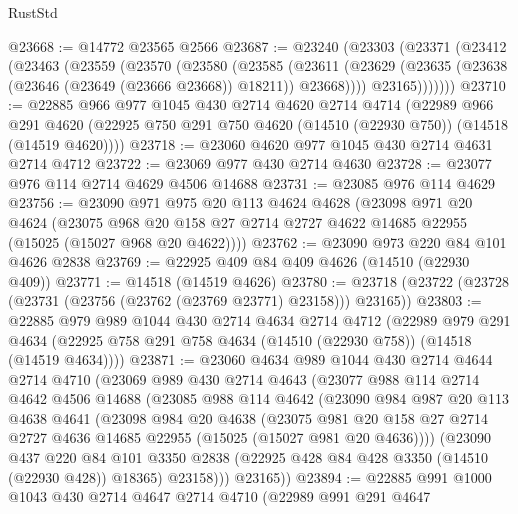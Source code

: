 \begin{lexlean}{RustStd}
\begin{coremodule}
@23668 := @14772 @23565 @2566
@23687 := @23240
    (@23303
      (@23371
        (@23412
          (@23463
            (@23559
              (@23570
                (@23580
                  (@23585
                    (@23611
                      (@23629 (@23635 (@23638 (@23646 (@23649 (@23666 @23668)) @18211)) @23668))))
                  @23165)))))))
@23710 := @22885
    @966
    @977
    @1045
    @430
    @2714
    @4620
    @2714
    @4714
    (@22989
      @966
      @291
      @4620
      (@22925 @750 @291 @750 @4620 (@14510 (@22930 @750)) (@14518 (@14519 @4620))))
@23718 := @23060 @4620 @977 @1045 @430 @2714 @4631 @2714 @4712
@23722 := @23069 @977 @430 @2714 @4630
@23728 := @23077 @976 @114 @2714 @4629 @4506 @14688
@23731 := @23085 @976 @114 @4629
@23756 := @23090
    @971
    @975
    @20
    @113
    @4624
    @4628
    (@23098
      @971
      @20
      @4624
      (@23075 @968 @20 @158 @27 @2714 @2727 @4622 @14685 @22955 (@15025 (@15027 @968 @20 @4622))))
@23762 := @23090 @973 @220 @84 @101 @4626 @2838
@23769 := @22925 @409 @84 @409 @4626 (@14510 (@22930 @409))
@23771 := @14518 (@14519 @4626)
@23780 := @23718 (@23722 (@23728 (@23731 (@23756 (@23762 (@23769 @23771) @23158))) @23165))
@23803 := @22885
    @979
    @989
    @1044
    @430
    @2714
    @4634
    @2714
    @4712
    (@22989
      @979
      @291
      @4634
      (@22925 @758 @291 @758 @4634 (@14510 (@22930 @758)) (@14518 (@14519 @4634))))
@23871 := @23060
    @4634
    @989
    @1044
    @430
    @2714
    @4644
    @2714
    @4710
    (@23069
      @989
      @430
      @2714
      @4643
      (@23077
        @988
        @114
        @2714
        @4642
        @4506
        @14688
        (@23085
          @988
          @114
          @4642
          (@23090
            @984
            @987
            @20
            @113
            @4638
            @4641
            (@23098
              @984
              @20
              @4638
              (@23075
                @981
                @20
                @158
                @27
                @2714
                @2727
                @4636
                @14685
                @22955
                (@15025 (@15027 @981 @20 @4636))))
            (@23090
              @437
              @220
              @84
              @101
              @3350
              @2838
              (@22925 @428 @84 @428 @3350 (@14510 (@22930 @428)) @18365)
              @23158)))
        @23165))
@23894 := @22885
    @991
    @1000
    @1043
    @430
    @2714
    @4647
    @2714
    @4710
    (@22989
      @991
      @291
      @4647

\end{coremodule}
\end{lexlean}
